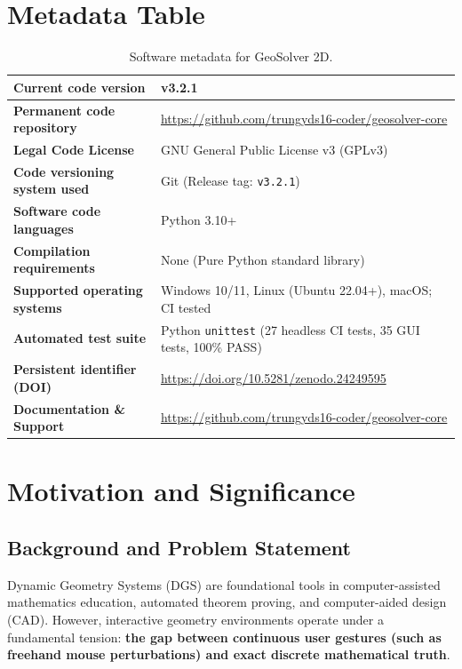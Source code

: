 \documentclass[preprint,12pt]{elsarticle}
\begin{document}
\section*{Metadata Table}

\begin{table}[h!]
\centering
\small
\begin{tabular}{lp{9.5cm}}
\toprule
\textbf{Current code version} & v3.2.1 \\
\midrule
\textbf{Permanent code repository} & \url{https://github.com/trungyds16-coder/geosolver-core} \\
\textbf{Legal Code License} & GNU General Public License v3 (GPLv3) \\
\textbf{Code versioning system used} & Git (Release tag: \texttt{v3.2.1}) \\
\textbf{Software code languages} & Python 3.10+ \\
\textbf{Compilation requirements} & None (Pure Python standard library) \\
\textbf{Supported operating systems} & Windows 10/11, Linux (Ubuntu 22.04+), macOS; CI tested \\
\textbf{Automated test suite} & Python \texttt{unittest} (27 headless CI tests, 35 GUI tests, 100\% PASS) \\
\textbf{Persistent identifier (DOI)} & \url{https://doi.org/10.5281/zenodo.24249595} \\
\textbf{Documentation \& Support} & \url{https://github.com/trungyds16-coder/geosolver-core} \\
\bottomrule
\end{tabular}
\caption{Software metadata for GeoSolver 2D.}
\label{tab:metadata}
\end{table}

\section{Motivation and Significance}

\subsection{Background and Problem Statement}
Dynamic Geometry Systems (DGS) are foundational tools in computer-assisted mathematics education, automated theorem proving, and computer-aided design (CAD). However, interactive geometry environments operate under a fundamental tension: \textbf{the gap between continuous user gestures (such as freehand mouse perturbations) and exact discrete mathematical truth}.
\end{document}
